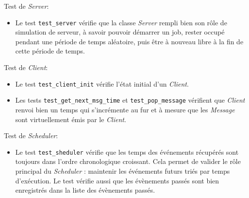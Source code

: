 \documentclass[11pt,a4paper]{article}
\begin{document}
\bigskip

Test de \emph{Server}:
\begin{itemize}
    \item Le test \lstinline|test_server| vérifie que la classe \emph{Server} rempli bien son rôle de simulation de serveur, à savoir pouvoir démarrer un job, rester occupé pendant une période de temps aléatoire, puis être à nouveau libre à la fin de cette période de temps.
\end{itemize}

\bigskip

Test de \emph{Client}:
\begin{itemize}
    \item Le test \lstinline|test_client_init| vérifie l'état initial d'un \emph{Client}.
    \item Les tests \lstinline|test_get_next_msg_time| et \lstinline|test_pop_message| vérifient que \emph{Client} renvoi bien un temps qui s'incrémente au fur et à mesure que les \emph{Message} sont virtuellement émis par le \emph{Client}.
\end{itemize}

\bigskip

Test de \emph{Scheduler}:
\begin{itemize}
    \item Le test \lstinline|test_sheduler| vérifie que les temps des événements récupérés sont toujours dans l'ordre chronologique croissant. Cela permet de valider le rôle principal du \emph{Scheduler} : maintenir les événements futurs triés par temps d'exécution. Le test vérifie aussi que les évènements passés sont bien enregistrés dans la liste des évènements passés.
\end{itemize}

\bigskip
\end{document}

